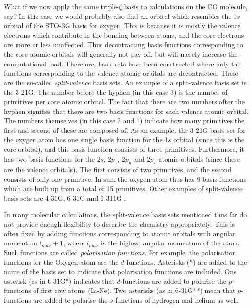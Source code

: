 What if we now apply the same triple-$\zeta$ basis to calculations on the CO molecule, say? In this case we would probably also find an orbital which resembles the 1$s$
orbital of the STO-3G basis for oxygen. This is because it is mostly the valence electrons which contribute in the bonding between atoms, and the core electrons are more or less unaffected.
Thus decontracting basis functions corresponding to the core atomic orbitals will generally not pay off, but will merely increase the computational load. Therefore, basis
sets have been constructed where only the functions corresponding to the valence atomic orbitals are decontracted. These are the so-called \emph{split-valence} basis sets. 
An example of a split-valence basis set is the 3-21G. The number before the hyphen (in this case 3) is the number of primitives per core atomic orbital. The fact that there are
two numbers after the hyphen signifies that there are two basis functions for each valence atomic orbital. The numbers themselves (in this case 2 and 1) indicate how many primitives
the first and second of these are composed of. As an example, the 3-21G basis set for the oxygen atom has one single
basis function for the 1$s$ orbital (since this is the core orbital), and this basis function consists of three primitives. Furthermore, it has two basis functions for the 2$s$,
2$p_x$, 2$p_y$ and 2$p_z$ atomic orbitals (since these are the valence orbitals). The first consists of two primitives, and the second consists of only one
primitive. In sum the oxygen atom thus has 9 basis functions which are built up from a total of 15 primitives.
Other examples of split-valence basis sets are 4-31G, 6-31G and 6-311G \cite{Cramer}.

In many molecular calculations, the split-valence basis sets mentioned thus far do not provide enough flexibility to describe the chemistry appropriately.
This is often fixed by adding functions
corresponding to atomic orbitals with angular momentum $l_{max}+1$, where $l_{max}$ is the highest angular momentum of the atom. 
Such functions are called \emph{polarisation functions}. For example, the polarisation functions for the Oxygen atom are the $d$-functions. Asterisks (*) are added to the name of the basis set to indicate that polarisation
functions are included. One asterisk (as in 6-31G*) indicates that $d$-functions are added to polarise the $p$-functions of first row atoms (Li-Ne). Two asterisks (as in 6-31G**)
mean that $p$-functions are added to polarise the $s$-functions of hydrogen and helium as well.


